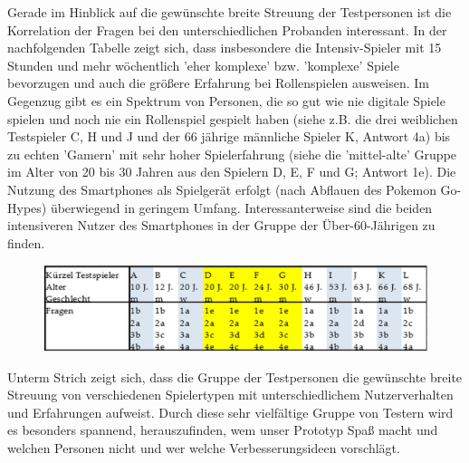 \documentclass[extern,palatino]{cgBA}
\begin{document}
Gerade im Hinblick auf die gewünschte breite Streuung der Testpersonen ist die Korrelation der Fragen bei den unterschiedlichen Probanden interessant. In der nachfolgenden Tabelle zeigt sich, dass insbesondere die Intensiv-Spieler mit 15 Stunden und mehr wöchentlich 'eher komplexe' bzw. 'komplexe' Spiele bevorzugen und auch die größere Erfahrung bei Rollenspielen ausweisen.  Im Gegenzug gibt es ein Spektrum von Personen, die so gut wie nie digitale Spiele spielen und noch nie ein Rollenspiel gespielt haben (siehe z.B. die drei weiblichen Testspieler C, H und J und der 66 jährige männliche Spieler K, Antwort 4a) bis zu echten 'Gamern' mit sehr hoher Spielerfahrung (siehe die 'mittel-alte' Gruppe im Alter von 20 bis 30 Jahren aus den Spielern D, E, F und G; Antwort 1e). Die Nutzung des Smartphones als Spielgerät erfolgt (nach Abflauen des Pokemon Go-Hypes) überwiegend in geringem Umfang. Interessanterweise sind die beiden intensiveren Nutzer des Smartphones in der Gruppe der Über-60-Jährigen zu finden.
\begin{figure}[H]
	\centering
	\includegraphics[width=1\textwidth]{testspieler.jpg}
\end{figure} 
Unterm Strich zeigt sich, dass die Gruppe der Testpersonen die gewünschte breite Streuung von verschiedenen Spielertypen mit unterschiedlichem Nutzerverhalten und Erfahrungen aufweist.  Durch diese sehr vielfältige Gruppe von Testern wird es besonders spannend, herauszufinden, wem unser Prototyp Spaß macht und welchen Personen nicht und wer welche Verbesserungsideen vorschlägt.
\newpage
\end{document}

